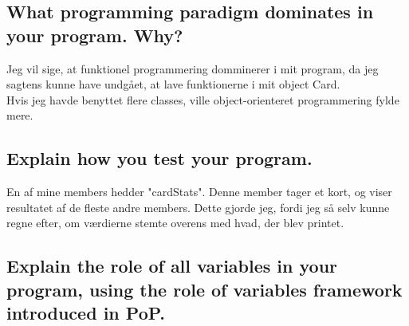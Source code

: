 \documentclass[a4paper,12pt]{article}
\begin{document}
\subsection{What programming paradigm dominates in your program. Why?}

Jeg vil sige, at funktionel programmering domminerer i mit program, da jeg sagtens kunne have undgået, at lave funktionerne i mit object Card.\\
Hvis jeg havde benyttet flere classes, ville object-orienteret programmering fylde mere. 

\subsection{Explain how you test your program.}

En af mine members hedder "cardStats". Denne member tager et kort, og viser resultatet af de fleste andre members. Dette gjorde jeg, fordi jeg så selv kunne regne efter, om værdierne stemte overens med hvad, der blev printet.

\subsection{Explain the role of all variables in your program, using the role of variables framework introduced in PoP.}
\end{document}
